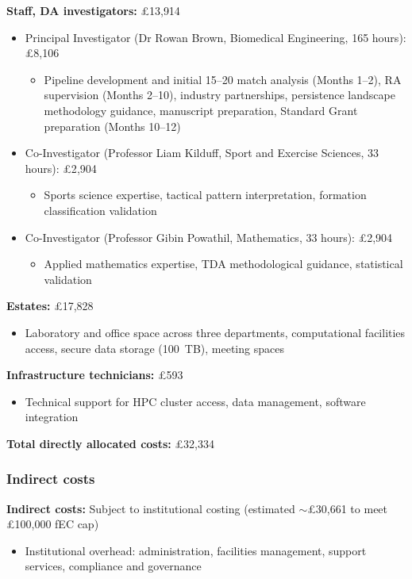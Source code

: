 \textbf{Staff, DA investigators:} \pounds13{,}914
\begin{itemize}
  \item Principal Investigator (Dr Rowan Brown, Biomedical Engineering, 165 hours): \pounds8{,}106
  \begin{itemize}[nosep]
    \item Pipeline development and initial 15--20 match analysis (Months 1--2), RA supervision (Months 2--10), industry partnerships, persistence landscape methodology guidance, manuscript preparation, Standard Grant preparation (Months 10--12)
  \end{itemize}
  \item Co-Investigator (Professor Liam Kilduff, Sport and Exercise Sciences, 33 hours): \pounds2{,}904
  \begin{itemize}[nosep]
    \item Sports science expertise, tactical pattern interpretation, formation classification validation
  \end{itemize}
  \item Co-Investigator (Professor Gibin Powathil, Mathematics, 33 hours): \pounds2{,}904
  \begin{itemize}[nosep]
    \item Applied mathematics expertise, TDA methodological guidance, statistical validation
  \end{itemize}
\end{itemize}

\textbf{Estates:} \pounds17{,}828
\begin{itemize}
  \item Laboratory and office space across three departments, computational facilities access, secure data storage (100~TB), meeting spaces
\end{itemize}

\textbf{Infrastructure technicians:} \pounds593
\begin{itemize}
  \item Technical support for HPC cluster access, data management, software integration
\end{itemize}

\textbf{Total directly allocated costs:} \pounds32{,}334

\subsubsection{Indirect costs}

\textbf{Indirect costs:} Subject to institutional costing (estimated $\sim$\pounds30{,}661 to meet \pounds100{,}000 fEC cap)
\begin{itemize}
  \item Institutional overhead: administration, facilities management, support services, compliance and governance
\end{itemize}

